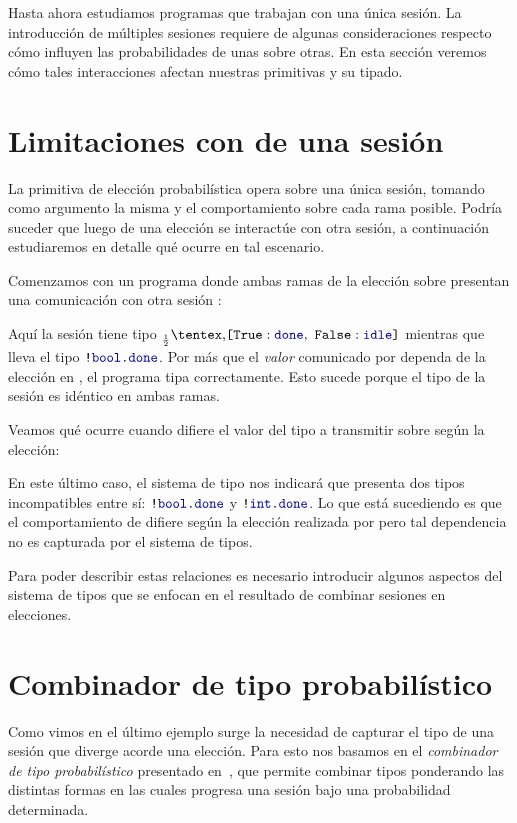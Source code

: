\label{cap:elecciones_multi_sesion}
Hasta ahora estudiamos programas que trabajan con una única sesión. La
introducción de múltiples sesiones requiere de algunas consideraciones respecto
cómo influyen las probabilidades de unas sobre otras. En esta sección veremos
cómo tales interacciones afectan nuestras primitivas y su tipado.

\section{Limitaciones con  de una sesión}

La primitiva de elección probabilística  opera sobre una única sesión,
tomando como argumento la misma y el comportamiento sobre cada rama posible.
Podría suceder que luego de una elección se interactúe con otra sesión, a
continuación estudiaremos en detalle qué ocurre en tal escenario.

Comenzamos con un programa donde ambas ramas de la elección sobre 
presentan una comunicación con otra sesión :

\TwoSessionsPickBothBranches

Aquí la sesión  tiene tipo $\BinaryPChoice[\frac{1}{2}]{\Done}{\Idle}$
mientras que  lleva el tipo $\Out\tbool\Done$. Por más que el \emph{valor}
comunicado por  dependa de la elección en , el programa tipa
correctamente. Esto sucede porque el tipo de la sesión es idéntico en ambas
ramas.

Veamos qué ocurre cuando difiere el valor del tipo a transmitir sobre 
según la elección:

\TwoSessionsInvalidPickBothBranches

En este último caso, el sistema de tipo nos indicará que  presenta dos
tipos incompatibles entre sí: $\Out\tbool\Done$ y $\Out\tint\Done$. Lo que está
sucediendo es que el comportamiento de  difiere según la elección
realizada por  pero tal dependencia no es capturada por el sistema de
tipos.

Para poder describir estas relaciones es necesario introducir algunos aspectos
del sistema de tipos que se enfocan en el resultado de combinar sesiones en
elecciones.

\section{Combinador de tipo probabilístico}

Como vimos en el último ejemplo surge la necesidad de capturar el tipo de una
sesión que diverge acorde una elección. Para esto nos basamos en el
\emph{combinador de tipo probabilístico} presentado
en~\cite{DBLP:conf/concur/InversoMPTT20}, que permite combinar tipos ponderando
las distintas formas en las cuales progresa una sesión bajo una probabilidad
determinada.

